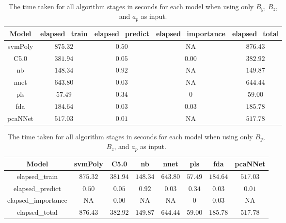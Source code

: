 \begin{table}[!ht]
	\centering
	\begin{tabular}{|c|c|c|c|c|}
		\hline
		Model & elapsed_train & elapsed_predict & elapsed_importance & elapsed_total \\ \hline
		svmPoly & $875.32$ & $0.50$ & NA & $876.43$ \\ \hline
		C5.0 & $381.94$ & $0.05$ & $0.00$ & $382.92$ \\ \hline
		nb & $148.34$ & $0.92$ & NA & $149.87$ \\ \hline
		nnet & $643.80$ & $0.03$ & NA & $644.44$ \\ \hline
		pls & $57.49$ & $0.34$ & $0$ & $59.00$ \\ \hline
		fda & $184.64$ & $0.03$ & $0.03$ & $185.78$ \\ \hline
		pcaNNet & $517.03$ & $0.01$ & NA & $517.78$ \\ \hline
	\end{tabular}
	\caption{The time taken for all algorithm stages in seconds for each model when using only $B_{y}$, $B_{z}$, and $a_{p}$ as input.}
	\label{tab:time:yzap}
\end{table}

\begin{table}[!ht]
	\centering
	\begin{tabular}{|c|c|c|c|c|c|c|c|}
		\hline
		Model & svmPoly & C5.0 & nb & nnet & pls & fda & pcaNNet \\ \hline
		elapsed_train & $875.32$ & $381.94$ & $148.34$ & $643.80$ & $57.49$ & $184.64$ & $517.03$ \\ \hline
		elapsed_predict & $0.50$ & $0.05$ & $0.92$ & $0.03$ & $0.34$ & $0.03$ & $0.01$ \\ \hline
		elapsed_importance & NA & $0.00$ & NA & NA & $0$ & $0.03$ & NA \\ \hline
		elapsed_total & $876.43$ & $382.92$ & $149.87$ & $644.44$ & $59.00$ & $185.78$ & $517.78$ \\ \hline
	\end{tabular}
	\caption{The time taken for all algorithm stages in seconds for each model when using only $B_{y}$, $B_{z}$, and $a_{p}$ as input.}
	\label{tab:time:reverse:yzap}
\end{table}

